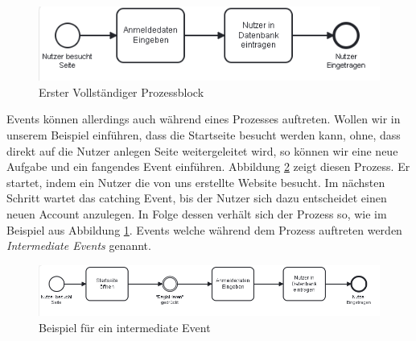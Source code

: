 \begin{figure}
\centering
\includegraphics[scale=1.0]{Figures/Beispiel2}
\decoRule
\caption[Prozess Block]{Erster Vollständiger Prozessblock}
\label{ersterProz}
\end{figure}Events können allerdings auch während eines Prozesses auftreten. Wollen wir in unserem Beispiel einführen, dass die Startseite besucht werden kann, ohne, dass direkt auf die Nutzer anlegen Seite weitergeleitet wird, so können wir eine neue Aufgabe und ein fangendes Event einführen. Abbildung \ref{eventproz} zeigt diesen Prozess. Er startet, indem ein Nutzer die von uns erstellte Website besucht. Im nächsten Schritt wartet das catching Event, bis der Nutzer sich dazu entscheidet einen neuen Account anzulegen. In Folge dessen verhält sich der Prozess so, wie im Beispiel aus Abbildung \ref{ersterProz}. Events welche während dem Prozess auftreten werden \textit{Intermediate Events} genannt.
\begin{figure}
\centering
\includegraphics[scale=0.6]{Figures/Beispiel3}
\decoRule
\caption[Intermediate Events]{Beispiel für ein intermediate Event}
\label{eventproz}
\end{figure}
